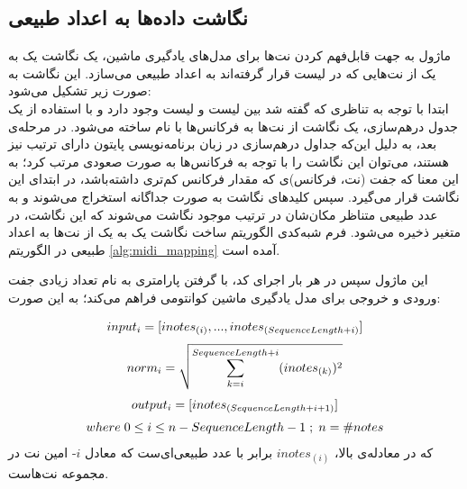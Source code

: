 \subsection{نگاشت داده‌ها به اعداد طبیعی}
ماژول 
به جهت قابل‌فهم کردن نت‌ها برای مدل‌های یادگیری ماشین، یک نگاشت یک به یک از نت‌هایی که در لیست
قرار گرفته‌اند به اعداد طبیعی می‌سازد. این نگاشت به صورت زیر تشکیل می‌شود: \\
ابتدا با توجه به تناظری که گفته شد بین لیست
و لیست
وجود دارد و با استفاده از یک جدول درهم‌سازی، یک نگاشت از نت‌ها به فرکانس‌ها با نام
ساخته می‌شود. در مرحله‌ی بعد، به دلیل این‌که جداول درهم‌سازی در زبان برنامه‌نویسی پایتون دارای ترتیب نیز هستند، می‌توان این نگاشت را با توجه به فرکانس‌ها به صورت صعودی مرتب کرد؛ به این معنا که جفت (نت، فرکانس)ی که مقدار فرکانس کم‌تری داشته‌باشد، در ابتدای این نگاشت قرار می‌گیرد. سپس کلیدهای نگاشت
به صورت جداگانه استخراج می‌شوند و به عدد طبیعی متناظر مکان‌شان در ترتیب موجود نگاشت می‌شوند که این نگاشت، در متغیر
ذخیره می‌شود.
فرم شبه‌کدی الگوریتم ساخت نگاشت یک به یک از نت‌ها به اعداد طبیعی در الگوریتم
\ref{alg:midi_mapping}
آمده است.



این ماژول سپس در هر بار اجرای کد، با گرفتن پارامتری به نام
تعداد زیادی جفت ورودی و خروجی برای مدل یادگیری ماشین کوانتومی فراهم می‌کند؛ به این صورت:

\begin{equation}
    \begin{gathered}
    input_i = [inotes_{(i)}, ..., inotes_{(SequenceLength + i)}] \\[3pt]
    norm_i = \sqrt{\sum^{SequenceLength+i}_{k=i} (inotes_{(k)})^2 } \\[3pt]
    output_i = [inotes_{(SequenceLength + i + 1)}] \\[3pt]
    where \hspace{1mm} 0 \leq i \leq n - SequenceLength - 1 \hspace{1mm} ; \hspace{1mm} n = \#notes
    \end{gathered}
\end{equation}
که در معادله‌ی بالا،
$inotes_{(i)}$
برابر با عدد طبیعی‌ای‌ست که معادل
$i$-
امین نت در مجموعه نت‌هاست.
